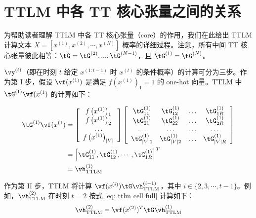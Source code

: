 \section{TTLM 中各 TT 核心张量之间的关系}
\label{sec: relationship}

为帮助读者理解 TTLM 中各 TT 核心张量（core）的作用，我们在此给出 TTLM 计算文本 $X = [x^{(1)}, x^{(2)}, \cdots ,x^{(N)}]$ 概率的详细过程。注意，所有中间 TT 核心张量彼此相等：$\tG = \tG^{(2)},...,\tG^{(N-1)}$，且 $\tG^{(1)} = \tG^{(N)}$。

$\vy^{(t)}$（即在时刻 $t$ 给定 $x^{(1:t-1)}$ 时 $x^{(t)}$ 的条件概率）的计算可分为三步。作为第 I 步，假设 $\vf(x^{(1)})$ 是满足 $f(x^{(1)})_1 = 1$ 的 one-hot 向量。TTLM 中 $\tG^{(1)}\vf(x^{(1})$ 的计算如下：

\begin{align}
\tG^{(1)}\vf(x^{(1}) &=
\left[\begin{array}{c}
f\left(x^{(1)}\right)_1 \\
f\left(x^{(1)}\right)_2 \\
\ldots \\
f\left(x^{(1)}\right)_{|V|}
\end{array}\right] \left[\begin{array}{cccc}
\tG_{11}^{(1)} & \tG_{12}^{(1)} & \ldots & \tG_{1 R}^{(1)} \\
\tG_{21}^{(1)} & \tG_{22}^{(1)} & \ldots & \tG_{2 R}^{(1)} \\
\ldots & \ldots & \ldots & \ldots \\
\tG_{|V| 1}^{(1)} & \tG_{|V| 2}^{(1)} & \ldots & \tG_{|V| R}^{(1)}
\end{array}\right] \nonumber \\
&=\left[\tG_{11}^{(1)}, \tG_{12}^{(1)}, \cdots, \tG_{1R}^{(1)}\right]^T \nonumber \\
&=\vh_{\textrm{TTLM}}^{(1)} \nonumber
\end{align}


作为第 II 步，TTLM 将计算
$\vf(x^{(i)})\tG\vh^{(i-1)}_{\textrm{TTLM}}$，其中 $i \in \{2,3,\cdots,t-1\}$。例如，$\vh_{\textrm{TTLM}}^{(2)}$ 在时刻 $t= 2$ 按式 \ref{eq: ttlm cell full} 计算如下：
\begin{align}
    \vh_{\textrm{TTLM}}^{(2)} = \vf(x^{(2)})^T\tG  \vh^{(1)}_{\textrm{TTLM}} \nonumber
\end{align}

